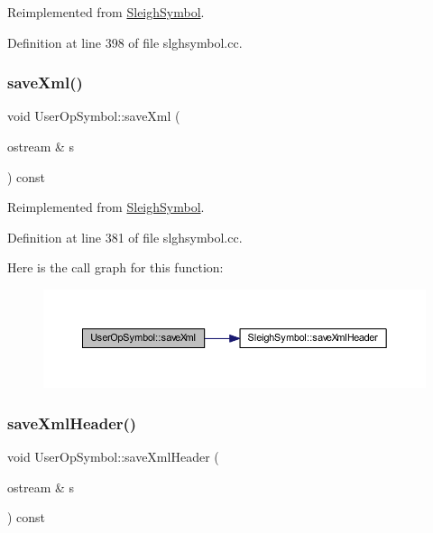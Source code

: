Reimplemented from \mbox{\hyperlink{class_sleigh_symbol_accaec1696f99366fb0e089a7fceb56a3}{Sleigh\+Symbol}}.



Definition at line 398 of file slghsymbol.\+cc.

\mbox{\label{class_user_op_symbol_a51162d8d46fb1d515d65a5b56d2864d4}} 
\subsubsection{\texorpdfstring{saveXml()}{saveXml()}}
{\footnotesize\ttfamily void User\+Op\+Symbol\+::save\+Xml (\begin{DoxyParamCaption}\item[{ostream \&}]{s }\end{DoxyParamCaption}) const\hspace{0.3cm}{\ttfamily [virtual]}}



Reimplemented from \mbox{\hyperlink{class_sleigh_symbol_a83c9a32d16419d2277c5b9d542e1cf13}{Sleigh\+Symbol}}.



Definition at line 381 of file slghsymbol.\+cc.

Here is the call graph for this function\+:
\nopagebreak
\begin{figure}[H]
\begin{center}
\leavevmode
\includegraphics[width=350pt]{class_user_op_symbol_a51162d8d46fb1d515d65a5b56d2864d4_cgraph}
\end{center}
\end{figure}
\mbox{\label{class_user_op_symbol_ae799003f975f31055383301b15c6cf0f}} 
\subsubsection{\texorpdfstring{saveXmlHeader()}{saveXmlHeader()}}
{\footnotesize\ttfamily void User\+Op\+Symbol\+::save\+Xml\+Header (\begin{DoxyParamCaption}\item[{ostream \&}]{s }\end{DoxyParamCaption}) const\hspace{0.3cm}{\ttfamily [virtual]}}




